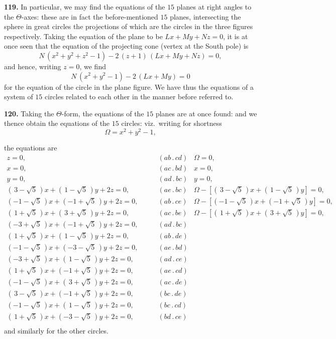 \documentclass[11pt]{article}
\newcommand{\artno}[1]{\textbf{#1.}\quad}
\begin{document}
\medskip
\noindent
\artno{119} In particular, we may find the equations of the $15$ planes at
right angles to the $\Theta$-axes: these are in fact the before-mentioned
$15$ planes, intersecting the sphere in great circles the projections of
which are the circles in the three figures respectively. Taking the equation
of the plane to be $Lx + My + Nz = 0$, it is at once seen that the equation
of the projecting cone (vertex at the South pole) is
\[
  N\,(x^{2} + y^{2} + z^{2} - 1) - 2\,(z + 1)\,(L x + M y + N z) = 0,
\]
and hence, writing $z = 0$, we find
\[
  N\,(x^{2} + y^{2} - 1) - 2\,(L x + M y) = 0
\]
for the equation of the circle in the plane figure. We have thus the
equations of a system of $15$ circles related to each other in the manner
before referred to.

\medskip
\noindent
\artno{120} Taking the $\Theta$-form, the equations of the $15$ planes are
at once found: and we thence obtain the equations of the $15$ circles:
viz.\ writing for shortness
\[
  \Omega = x^{2} + y^{2} - 1,
\]

\bigskip
\noindent
the equations are
\begin{align*}
  z = 0,&\qquad (ab\,.\,cd) &\Omega = 0,&\\
  x = 0,&\qquad (ac\,.\,bd) &x = 0,&\\
  y = 0,&\qquad (ad\,.\,bc) &y = 0,&\\
  (\,3 - \sqrt{5}\,)x + (\,1 - \sqrt{5}\,)y + 2z = 0,&\qquad (ae\,.\,bc)
        &\Omega - [(\,3 - \sqrt{5}\,)x + (\,1 - \sqrt{5}\,)y] = 0,&\\
  (-1 - \sqrt{5}\,)x + (-1 + \sqrt{5}\,)y + 2z = 0,&\qquad (ab\,.\,ce)
        &\Omega - [(-1 - \sqrt{5}\,)x + (-1 + \sqrt{5}\,)y] = 0,&\\
  (\,1 + \sqrt{5}\,)x + (\,3 + \sqrt{5}\,)y + 2z = 0,&\qquad (ac\,.\,be)
        &\Omega - [(\,1 + \sqrt{5}\,)x + (\,3 + \sqrt{5}\,)y] = 0,&\\
  (-3 + \sqrt{5}\,)x + (-1 + \sqrt{5}\,)y + 2z = 0,&\qquad (ad\,.\,bc) &&\\
  (\,1 + \sqrt{5}\,)x + (\,1 - \sqrt{5}\,)y + 2z = 0,&\qquad (ab\,.\,de) &&\\
  (-1 - \sqrt{5}\,)x + (-3 - \sqrt{5}\,)y + 2z = 0,&\qquad (ae\,.\,bd) &&\\
  (-3 + \sqrt{5}\,)x + (\,1 - \sqrt{5}\,)y + 2z = 0,&\qquad (ad\,.\,ce) &&\\
  (\,1 + \sqrt{5}\,)x + (-1 + \sqrt{5}\,)y + 2z = 0,&\qquad (ae\,.\,cd) &&\\
  (-1 - \sqrt{5}\,)x + (\,3 + \sqrt{5}\,)y + 2z = 0,&\qquad (ac\,.\,de) &&\\
  (\,3 - \sqrt{5}\,)x + (-1 + \sqrt{5}\,)y + 2z = 0,&\qquad (bc\,.\,de) &&\\
  (-1 - \sqrt{5}\,)x + (\,1 - \sqrt{5}\,)y + 2z = 0,&\qquad (bc\,.\,cd) &&\\
  (\,1 + \sqrt{5}\,)x + (-3 - \sqrt{5}\,)y + 2z = 0,&\qquad (bd\,.\,ce) &&\\
\end{align*}
and similarly for the other circles.
\end{document}

